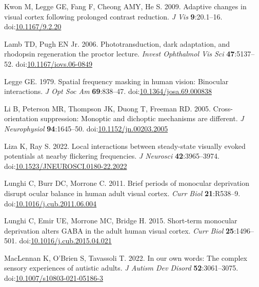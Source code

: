 \documentclass[
]{article}
\newlength{\cslhangindent}
\newlength{\cslentryspacingunit} %
\newenvironment{CSLReferences}[2] %
 {%
  \setlength{\parindent}{0pt}
  \ifodd #1
  \let\oldpar\par
  \def\par{\hangindent=\cslhangindent\oldpar}
  \fi
  \setlength{\parskip}{#2\cslentryspacingunit}
 }%
 {}
\begin{document}
\begin{CSLReferences}{1}{0}
\leavevmode{}%
Kwon M, Legge GE, Fang F, Cheong AMY, He S. 2009. Adaptive changes in visual cortex following prolonged contrast reduction. \emph{J Vis} \textbf{9}:20.1--16. doi:\href{https://doi.org/10.1167/9.2.20}{10.1167/9.2.20}

\leavevmode{}%
Lamb TD, Pugh EN Jr. 2006. Phototransduction, dark adaptation, and rhodopsin regeneration the proctor lecture. \emph{Invest Ophthalmol Vis Sci} \textbf{47}:5137--52. doi:\href{https://doi.org/10.1167/iovs.06-0849}{10.1167/iovs.06-0849}

\leavevmode{}%
Legge GE. 1979. Spatial frequency masking in human vision: Binocular interactions. \emph{J Opt Soc Am} \textbf{69}:838--47. doi:\href{https://doi.org/10.1364/josa.69.000838}{10.1364/josa.69.000838}

\leavevmode{}%
Li B, Peterson MR, Thompson JK, Duong T, Freeman RD. 2005. Cross-orientation suppression: Monoptic and dichoptic mechanisms are different. \emph{J Neurophysiol} \textbf{94}:1645--50. doi:\href{https://doi.org/10.1152/jn.00203.2005}{10.1152/jn.00203.2005}

\leavevmode{}%
Liza K, Ray S. 2022. Local interactions between steady-state visually evoked potentials at nearby flickering frequencies. \emph{J Neurosci} \textbf{42}:3965--3974. doi:\href{https://doi.org/10.1523/JNEUROSCI.0180-22.2022}{10.1523/JNEUROSCI.0180-22.2022}

\leavevmode{}%
Lunghi C, Burr DC, Morrone C. 2011. Brief periods of monocular deprivation disrupt ocular balance in human adult visual cortex. \emph{Curr Biol} \textbf{21}:R538--9. doi:\href{https://doi.org/10.1016/j.cub.2011.06.004}{10.1016/j.cub.2011.06.004}

\leavevmode{}%
Lunghi C, Emir UE, Morrone MC, Bridge H. 2015. Short-term monocular deprivation alters GABA in the adult human visual cortex. \emph{Curr Biol} \textbf{25}:1496--501. doi:\href{https://doi.org/10.1016/j.cub.2015.04.021}{10.1016/j.cub.2015.04.021}

\leavevmode{}%
MacLennan K, O'Brien S, Tavassoli T. 2022. In our own words: The complex sensory experiences of autistic adults. \emph{J Autism Dev Disord} \textbf{52}:3061--3075. doi:\href{https://doi.org/10.1007/s10803-021-05186-3}{10.1007/s10803-021-05186-3}


\end{CSLReferences}
\end{document}
